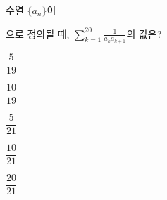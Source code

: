 \hspace*{2mm}\begin{minipage}[t]{\dimexpr\linewidth-2mm\relax}\vspace{0pt}
수열 $\{a_n\}$이 \par\smallskip{}\par{}\par\smallskip\noindent 으로 정의될 때, $\displaystyle\sum_{k=1}^{20}\frac{1}{a_ka_{k+1}}$의 값은?
\begin{choices32}{\rule[-3ex]{0pt}{8ex}$\dfrac{5}{19}$}{\rule[-3ex]{0pt}{8ex}$\dfrac{10}{19}$}{\rule[-3ex]{0pt}{8ex}$\dfrac{5}{21}$}{\rule[-3ex]{0pt}{8ex}$\dfrac{10}{21}$}{\rule[-3ex]{0pt}{8ex}$\dfrac{20}{21}$}\end{choices32}\end{minipage}
